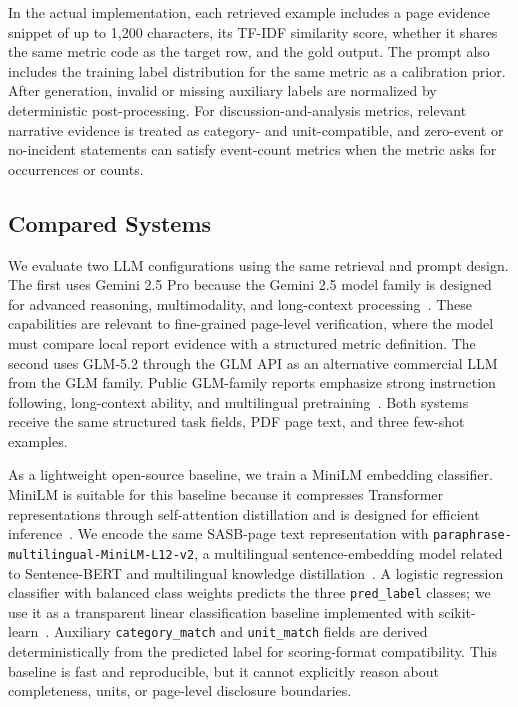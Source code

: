 \documentclass[sigconf,article]{acmart}
\newcommand{\openSource}{open\allowbreak-source}
\begin{document}
In the actual implementation, each retrieved example includes a page evidence snippet of up to 1,200 characters, its TF-IDF similarity score, whether it shares the same metric code as the target row, and the gold output. The prompt also includes the training label distribution for the same metric as a calibration prior. After generation, invalid or missing auxiliary labels are normalized by deterministic post-processing. For discussion-and-analysis metrics, relevant narrative evidence is treated as category- and unit-compatible, and zero-event or no-incident statements can satisfy event-count metrics when the metric asks for occurrences or counts.

\subsection{Compared Systems}
We evaluate two LLM configurations using the same retrieval and prompt design. The first uses Gemini 2.5 Pro because the Gemini 2.5 model family is designed for advanced reasoning, multimodality, and long-context processing~\cite{gemini2025gemini25}. These capabilities are relevant to fine-grained page-level verification, where the model must compare local report evidence with a structured metric definition. The second uses GLM-5.2 through the GLM API as an alternative commercial LLM from the GLM family. Public GLM-family reports emphasize strong instruction following, long-context ability, and multilingual pretraining~\cite{zeng2024chatglm}. Both systems receive the same structured task fields, PDF page text, and three few-shot examples.

As a lightweight \openSource{} baseline, we train a MiniLM embedding classifier. MiniLM is suitable for this baseline because it compresses Transformer representations through self-attention distillation and is designed for efficient inference~\cite{wang2020minilm}. We encode the same SASB-page text representation with \texttt{paraphrase-\allowbreak multilingual-\allowbreak MiniLM-\allowbreak L12-\allowbreak v2}, a multilingual sentence-embedding model related to Sentence-BERT and multilingual knowledge distillation~\cite{reimers2019sentencebert,reimers2020multilingual}. A logistic regression classifier with balanced class weights predicts the three \texttt{pred\_label} classes; we use it as a transparent linear classification baseline implemented with scikit-learn~\cite{pedregosa2011scikit}. Auxiliary \texttt{category\_match} and \texttt{unit\_match} fields are derived deterministically from the predicted label for scoring-format compatibility. This baseline is fast and reproducible, but it cannot explicitly reason about completeness, units, or page-level disclosure boundaries.
\end{document}
